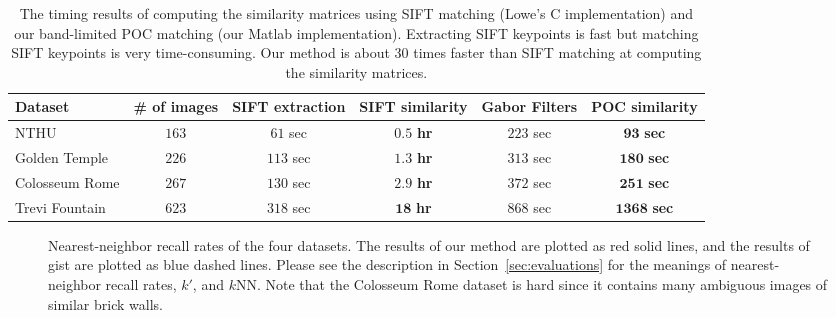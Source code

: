 \documentclass[conference]{IEEEtran}
\begin{document}
\begin{table*}[t]
\centering
\caption{The timing results of computing the similarity matrices using SIFT matching (Lowe's C implementation) and our band-limited POC matching (our Matlab implementation). Extracting SIFT keypoints is fast but matching SIFT keypoints is very time-consuming. Our method is about $30$ times faster than SIFT matching at computing the similarity matrices.}
\begin{tabular}{|l||c||c|c||c|c|}
\hline
Dataset           	&    \# of images  &   SIFT extraction &   SIFT similarity & Gabor Filters & POC similarity\\
\hline
\hline 
{\sf NTHU}          &     $163$      &     $61$ sec      &        $\mathbf{0.5}$ {\bf hr}      & $223$ sec & $\mathbf{93}$ {\bf sec}       \\
\hline 
{\sf Golden Temple} &     $226$      &     $113$ sec     &        $\mathbf{1.3}$ {\bf hr}      & $313$ sec & $\mathbf{180}$ {\bf sec}      \\
\hline 
{\sf Colosseum Rome}&     $267$      &     $130$ sec     &        $\mathbf{2.9}$ {\bf hr}      & $372$ sec & $\mathbf{251}$ {\bf sec}      \\
\hline 
{\sf Trevi Fountain}&     $623$      &     $318$ sec     &        $\mathbf{18}$ {\bf hr}       & $868$ sec & $\mathbf{1368}$ {\bf sec}        \\
\hline
\end{tabular}
\label{tab:timing}
\end{table*}

\begin{figure*}[t]
\centering
{}
\caption{Nearest-neighbor recall rates of the four datasets. The results of our method are plotted as red solid lines, and the results of gist are plotted as blue dashed lines. Please see the description in Section~\ref{sec:evaluations} for the meanings of nearest-neighbor recall rates, $k'$, and $k$NN. Note that the {\sf Colosseum Rome} dataset is hard since it contains many ambiguous images of similar brick walls. }
\label{fig:recall_rates}
\end{figure*}
\end{document}

